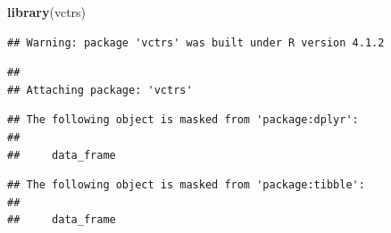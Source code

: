 \documentclass[
]{article}
\newenvironment{Shaded}{\begin{snugshade}}{\end{snugshade}}
\newcommand{\KeywordTok}[1]{\textcolor[rgb]{0.13,0.29,0.53}{\textbf{#1}}}
\newcommand{\NormalTok}[1]{#1}
\begin{document}
\begin{Shaded}
\begin{Highlighting}[]
\KeywordTok{library}\NormalTok{(vctrs)}
\end{Highlighting}
\end{Shaded}

\begin{verbatim}
## Warning: package 'vctrs' was built under R version 4.1.2
\end{verbatim}

\begin{verbatim}
## 
## Attaching package: 'vctrs'
\end{verbatim}

\begin{verbatim}
## The following object is masked from 'package:dplyr':
## 
##     data_frame
\end{verbatim}

\begin{verbatim}
## The following object is masked from 'package:tibble':
## 
##     data_frame
\end{verbatim}
\end{document}
